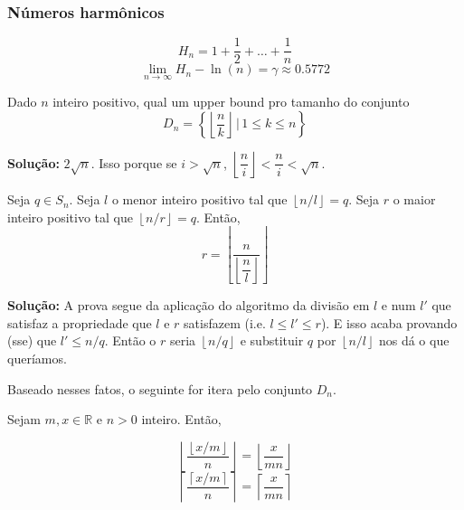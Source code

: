 
\subsubsection{Números harmônicos}

$$ H_n = 1 + \dfrac{1}{2} + \dots + \dfrac{1}{n}$$
$$ \lim\limits_{n \to \infty} H_n - \ln(n) = \gamma \approx 0.5772$$

 Dado $n$ inteiro positivo, qual um upper bound pro tamanho do conjunto
$$D_n = \left\{ \left\lfloor \dfrac{n}{k} \right\rfloor \, \vert \, 1 \leq k \leq n \right\}$$

\textbf{Solução:} $2 \sqrt{n}$. Isso porque se $i > \sqrt{n}$,
$\left\lfloor \dfrac{n}{i} \right\rfloor < \dfrac{n}{i} < \sqrt{n}$.

 Seja $q \in S_n$. Seja $l$ o menor inteiro positivo tal que $\left\lfloor n/l \right\rfloor = q$. Seja
$r$ o maior inteiro positivo tal que $\left\lfloor n/r \right\rfloor = q$. Então,
$$ r = \left\lfloor \dfrac{n}{\left\lfloor \dfrac{n}{l} \right\rfloor} \right\rfloor$$ 

\textbf{Solução:} A prova segue da aplicação do algoritmo da divisão em $l$ e num $l'$ que satisfaz 
a propriedade que $l$ e $r$ satisfazem (i.e. $l \leq l' \leq r$). E isso acaba provando (sse) que $l' \leq n/q$.
Então o $r$ seria $\left\lfloor n/q \right\rfloor$ e substituir $q$ por $\left\lfloor n/l \right\rfloor$ nos dá o que queríamos.

Baseado nesses fatos, o seguinte for itera pelo conjunto $D_n$.


Sejam $m, x \in \mathbb{R}$ e $n > 0$ inteiro. Então,

$$ \left\lfloor \dfrac{ \left\lfloor x / m \right\rfloor }{n} \right\rfloor = \left\lfloor \dfrac{x}{mn} \right\rfloor $$
$$ \left\lceil \dfrac{ \left\lceil x / m \right\rceil }{n} \right\rceil = \left\lceil \dfrac{x}{mn} \right\rceil $$